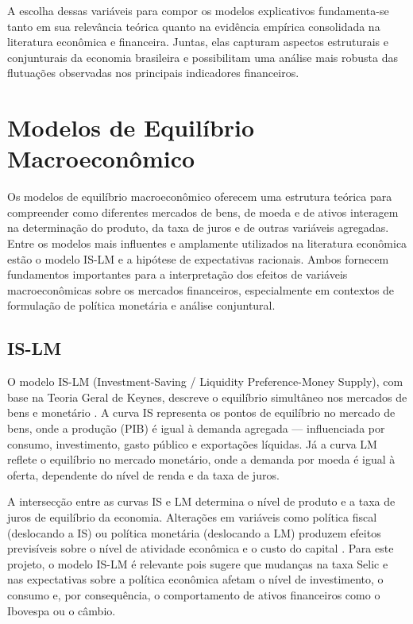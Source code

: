 \documentclass[	12pt, Times, openright, oneside, a4paper, english, brazil]{abntex2}
\begin{document}
A escolha dessas variáveis para compor os modelos explicativos fundamenta-se tanto em sua relevância teórica quanto na evidência empírica consolidada na literatura econômica e financeira. Juntas, elas capturam aspectos estruturais e conjunturais da economia brasileira e possibilitam uma análise mais robusta das flutuações observadas nos principais indicadores financeiros.

\section{Modelos de Equilíbrio Macroeconômico}

Os modelos de equilíbrio macroeconômico oferecem uma estrutura teórica para compreender como diferentes mercados de bens, de moeda e de ativos interagem na determinação do produto, da taxa de juros e de outras variáveis agregadas. Entre os modelos mais influentes e amplamente utilizados na literatura econômica estão o modelo IS-LM e a hipótese de expectativas racionais. Ambos fornecem fundamentos importantes para a interpretação dos efeitos de variáveis macroeconômicas sobre os mercados financeiros, especialmente em contextos de formulação de política monetária e análise conjuntural.

\subsection{IS-LM}
O modelo IS-LM (Investment-Saving / Liquidity Preference-Money Supply), com base na Teoria Geral de Keynes, descreve o equilíbrio simultâneo nos mercados de bens e monetário \cite{Assous2007}. A curva IS representa os pontos de equilíbrio no mercado de bens, onde a produção (PIB) é igual à demanda agregada — influenciada por consumo, investimento, gasto público e exportações líquidas. Já a curva LM reflete o equilíbrio no mercado monetário, onde a demanda por moeda é igual à oferta, dependente do nível de renda e da taxa de juros.

A intersecção entre as curvas IS e LM determina o nível de produto e a taxa de juros de equilíbrio da economia. Alterações em variáveis como política fiscal (deslocando a IS) ou política monetária (deslocando a LM) produzem efeitos previsíveis sobre o nível de atividade econômica e o custo do capital \cite{Klein2000}. Para este projeto, o modelo IS-LM é relevante pois sugere que mudanças na taxa Selic e nas expectativas sobre a política econômica afetam o nível de investimento, o consumo e, por consequência, o comportamento de ativos financeiros como o Ibovespa ou o câmbio.
\end{document}
